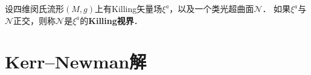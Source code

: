 \begin{definition}\label{chkerr:def_killing-horizon}
    设四维闵氏流形$(M,g)$上有Killing矢量场$\xi^a$，以及一个类光超曲面$\mathcal{N}$．
    如果$\xi^a$与$\mathcal{N}$正交，则称$\mathcal{N}$是$\xi^a$的{\heiti \bfseries Killing视界}．
\end{definition}

%
%
%
%




\section{Kerr--Newman解}

